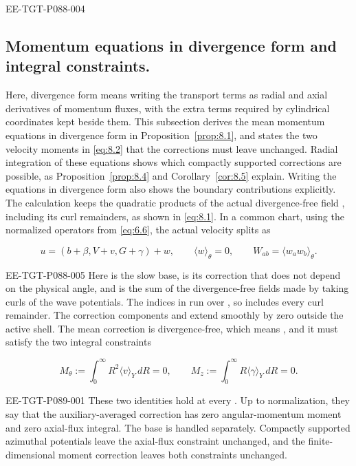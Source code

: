 \begin{EESegment}{EE-TGT-P088-004}
\subsection{Momentum equations in divergence form and integral constraints.}\label{sec:8.1}
Here, divergence form means writing the transport terms as radial and axial derivatives of
momentum fluxes, with the extra terms required by cylindrical coordinates kept beside them.
This subsection derives the mean momentum equations in divergence form in
Proposition~\ref{prop:8.1}, and states the two velocity moments in \eqref{eq:8.2} that the corrections
must leave unchanged. Radial integration of these equations shows which compactly supported
corrections are possible, as Proposition~\ref{prop:8.4} and Corollary~\ref{cor:8.5} explain. Writing
the equations in divergence form also shows the boundary contributions explicitly. The calculation
keeps the quadratic products of the actual divergence-free field
, including its curl remainders, as shown in \eqref{eq:8.1}. In a common
chart, using the normalized operators from \eqref{eq:6.6}, the actual velocity splits as
\end{EESegment}
\begin{equation}
  u=(b+\beta,V+v,G+\gamma)+w,
  \qquad \langle w\rangle_\theta=0,
  \qquad W_{ab}=\langle w_aw_b\rangle_\theta.
\tag{8.1}\label{eq:8.1}
\end{equation}
\begin{EESegment}{EE-TGT-P088-005}
Here  is the slow base,
 is its correction that does not depend on the
physical angle, and  is the sum of the divergence-free fields made by taking
curls of the wave potentials. The indices in  run over
, so  includes every curl
remainder. The correction components and  extend smoothly by zero outside
the active shell. The mean correction is divergence-free, which means
, and it must satisfy the two integral
constraints
\end{EESegment}
\begin{equation}
  M_\theta:=\int_0^\infty R^2\langle v\rangle_Y\,dR=0,
  \qquad
  M_z:=\int_0^\infty R\langle\gamma\rangle_Y\,dR=0.
\tag{8.2}\label{eq:8.2}
\end{equation}
%
\begin{EESegment}{EE-TGT-P089-001}
These two identities hold at every . Up to normalization, they say
that the auxiliary-averaged correction has zero angular-momentum moment and zero axial-flux
integral. The base is handled separately. Compactly supported azimuthal potentials leave the
axial-flux constraint unchanged, and the finite-dimensional moment correction leaves both
constraints unchanged.
\end{EESegment}

